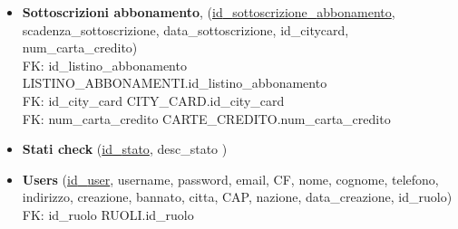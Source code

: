 \begin{itemize}
    \item 
    \textbf{Sottoscrizioni abbonamento},
    (\underline{id{\_}sottoscrizione{\_}abbonamento},
    scadenza{\_}sottoscrizione,
    data{\_}sottoscrizione,
    id{\_}citycard,
    num{\_}carta{\_}credito)\\
    FK: id{\_}listino{\_}abbonamento \textrightarrow LISTINO{\_}ABBONAMENTI.id{\_}listino{\_}abbonamento\\
    FK: id{\_}city{\_}card \textrightarrow CITY{\_}CARD.id{\_}city{\_}card\\
    FK: num{\_}carta{\_}credito \textrightarrow CARTE{\_}CREDITO.num{\_}carta{\_}credito
    
    \item 
    \textbf{Stati check}
    (\underline{id{\_}stato},
    desc{\_}stato
    )
    \item 
    \textbf{Users}
    (\underline{id{\_}user},
    username,
    password,
    email,
    CF,
    nome,
    cognome,
    telefono,
    indirizzo,
    creazione,
    bannato,
    citta,
    CAP,
    nazione,
    data{\_}creazione,
    id{\_}ruolo)\\
    FK: id{\_}ruolo \textrightarrow RUOLI.id{\_}ruolo
    
\end{itemize}


